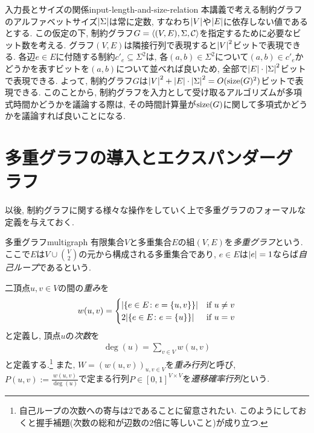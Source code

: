 \begin{remark}{入力長とサイズの関係}{input-length-and-size-relation}
  本講義で考える制約グラフのアルファベットサイズ$\abs{\Sigma}$は常に定数, すなわち$\abs{V}$や$\abs{E}$に依存しない値であるとする.
  この仮定の下, 制約グラフ$G=\langle(V,E),\Sigma,\mathcal{C}\rangle$を指定するために必要なビット数を考える.
  グラフ$(V,E)$は隣接行列で表現すると$\abs{V}^2$ビットで表現できる.
  各辺$e\in E$に付随する制約$c'_e\subseteq\Sigma^2$は, 各$(a,b)\in\Sigma^2$について$(a,b)\in c'_e$かどうかを表すビットを$(a,b)$について並べれば良いため, 全部で$\abs{E}\cdot\abs{\Sigma}^2$ビットで表現できる.
  よって, 制約グラフ$G$は$\abs{V}^2+\abs{E}\cdot\abs{\Sigma}^2 = O(\mathrm{size}(G)^2)$ビットで表現できる.
  このことから, 制約グラフを入力として受け取るアルゴリズムが多項式時間かどうかを議論する際は, その時間計算量が$\mathrm{size}(G)$に関して多項式かどうかを議論すれば良いことになる.
\end{remark}

\section{多重グラフの導入とエクスパンダーグラフ}

以後, 制約グラフに関する様々な操作をしていく上で多重グラフのフォーマルな定義を与えておく.

\begin{definition}{多重グラフ}{multigraph}
有限集合$V$と多重集合$E$の組$(V,E)$を\emph{多重グラフ}という.
ここで$E$は$V\cup \binom{V}{2}$の元から構成される多重集合であり, $e\in E$は$\abs{e}=1$ならば\emph{自己ループ}であるという.

二頂点$u,v\in V$の間の\emph{重み}を
\begin{align*}
  w(u,v) = \begin{cases}
   \abs{\qty{e\in E \colon e = \{u,v\}}} & \text{if } u\ne v \\
   2\abs{\qty{e\in E \colon e = \{u\}}} & \text{if } u=v
  \end{cases}
\end{align*}
と定義し, 頂点$u$の\emph{次数}を
\begin{align*}
  \deg(u) = \sum_{v\in V} w(u,v)
\end{align*}
と定義する.\footnote{自己ループの次数への寄与は$2$であることに留意されたい. このようにしておくと握手補題(次数の総和が辺数の$2$倍に等しいこと)が成り立つ.} また, $W=(w(u,v))_{u,v\in V}$を\emph{重み行列}と呼び, 
$P(u,v):=\frac{w(u,v)}{\deg(u)}$で定まる行列$P\in[0,1]^{V\times V}$を\emph{遷移確率行列}という.

\end{definition}


